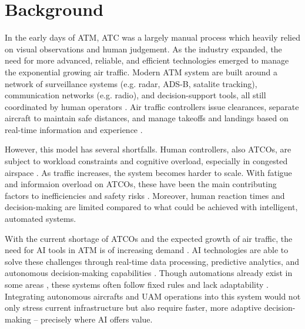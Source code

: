 \section{Background}


In the early days of \gls{ATM}, \gls{ATC} was a largely manual process which heavily relied on visual observations and human judgement. 
As the industry expanded, the need for more advanced, reliable, and efficient technologies emerged to manage the exponential growing air traffic.
Modern \gls{ATM} system are built around a network of surveillance systems (e.g. radar, \gls{ADS-B}, satalite tracking), communication networks (e.g. radio), and decision-support tools, all still coordinated by human operators \cite{Ramachandran_2025} \cite{careerroo2024technology}.  
Air traffic controllers issue clearances, separate aircraft to maintain safe distances, and manage takeoffs and landings based on real-time information and experience \cite{dfs2025controller}.

However, this model has several shortfalls. 
Human controllers, also \glspl{ATCO}, are subject to workload constraints and cognitive overload, especially in congested airspace \cite{Meier_2024}.
As traffic increases, the system becomes harder to scale. 
With fatigue and informaion overload on \glspl{ATCO}, these have been the main contributing factors to inefficiencies and safety risks \cite{Ramachandran_2025}. 
Moreover, human reaction times and decision-making are limited compared to what could be achieved with intelligent, automated systems.

With the current shortage of \glspl{ATCO} and the expected growth of air traffic, the need for \gls{AI} tools in \gls{ATM} is of increasing demand \cite{Meier_2024}.
\gls{AI} technologies are able to solve these challenges through real-time data processing, predictive analytics, and autonomous decision-making capabilities \cite{Ramachandran_2025}. 
Though automations already exist in some areas \cite{skybrary2025automation}, these systems often follow fixed rules and lack adaptability \cite{Meier_2024}. 
Integrating autonomous aircrafts and \gls{UAM} operations into this system would not only stress current infrastructure but also require faster, more adaptive decision-making \cite{Rumba_2020} -- precisely where AI offers value.


